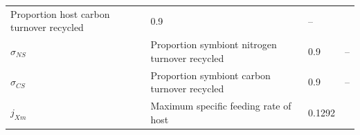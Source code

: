 \documentclass[]{elsarticle} %
\begin{document}
\begin{longtable}[c]{@{}llll@{}}
\begin{minipage}[t]{0.48\columnwidth}\raggedright\strut
Proportion host carbon turnover recycled
\strut\end{minipage} &
\begin{minipage}[t]{0.09\columnwidth}\raggedright\strut
0.9
\strut\end{minipage} &
\begin{minipage}[t]{0.23\columnwidth}\raggedright\strut
--
\strut\end{minipage}\tabularnewline
\begin{minipage}[t]{0.10\columnwidth}\raggedright\strut
\(\sigma_{NS}\)
\strut\end{minipage} &
\begin{minipage}[t]{0.48\columnwidth}\raggedright\strut
Proportion symbiont nitrogen turnover recycled
\strut\end{minipage} &
\begin{minipage}[t]{0.09\columnwidth}\raggedright\strut
0.9
\strut\end{minipage} &
\begin{minipage}[t]{0.23\columnwidth}\raggedright\strut
--
\strut\end{minipage}\tabularnewline
\begin{minipage}[t]{0.10\columnwidth}\raggedright\strut
\(\sigma_{CS}\)
\strut\end{minipage} &
\begin{minipage}[t]{0.48\columnwidth}\raggedright\strut
Proportion symbiont carbon turnover recycled
\strut\end{minipage} &
\begin{minipage}[t]{0.09\columnwidth}\raggedright\strut
0.9
\strut\end{minipage} &
\begin{minipage}[t]{0.23\columnwidth}\raggedright\strut
--
\strut\end{minipage}\tabularnewline
\begin{minipage}[t]{0.10\columnwidth}\raggedright\strut
\(j_{Xm}\)
\strut\end{minipage} &
\begin{minipage}[t]{0.48\columnwidth}\raggedright\strut
Maximum specific feeding rate of host
\strut\end{minipage} &
\begin{minipage}[t]{0.09\columnwidth}\raggedright\strut
0.1292
\strut\end{minipage} &
\begin{minipage}[t]{0.23\columnwidth}\raggedright\strut

\end{minipage}
\end{longtable}
\end{document}

